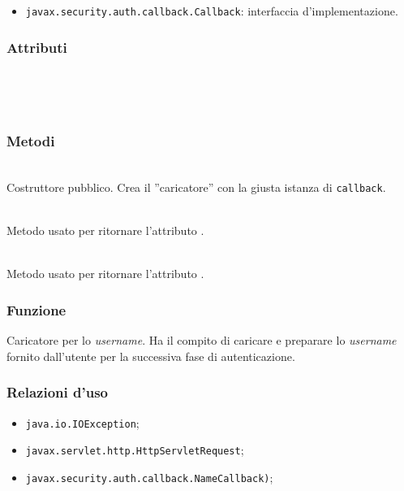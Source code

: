 \begin{itemize}
	\item \texttt{javax.security.auth.callback.Callback}: interfaccia d'implementazione.
\end{itemize}

\subsubsection*{Attributi}
\begin{description}
  \item{}\\
  \item{}\\
\end{description}

\subsubsection*{Metodi}
\begin{description}
	\item{}\\
	Costruttore pubblico. Crea il ''caricatore'' con la giusta istanza di \texttt{callback}.
	
	\item{}\\
	Metodo usato per ritornare l'attributo .
	
	\item{}\\
	Metodo usato per ritornare l'attributo .
	
\end{description}


\subsubsection*{Funzione}
Caricatore per lo \textit{username}. Ha il compito di caricare e preparare lo \textit{username} fornito dall'utente per la successiva fase di autenticazione.

\subsubsection*{Relazioni d'uso}
\begin{itemize}
	\item \texttt{java.io.IOException};
	\item \texttt{javax.servlet.http.HttpServletRequest};
	\item \texttt{javax.security.auth.callback.NameCallback)};
\end{itemize}

